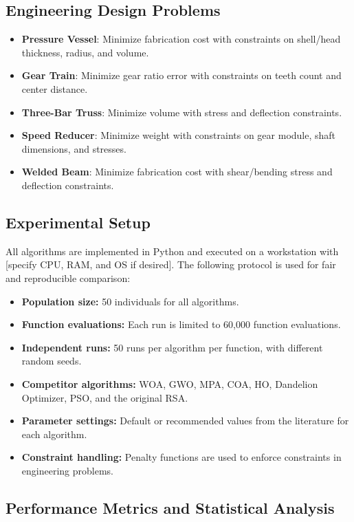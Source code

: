 \documentclass[12pt]{article}
\begin{document}
\subsection{Engineering Design Problems}
\begin{itemize}
    \item \textbf{Pressure Vessel}: Minimize fabrication cost with constraints on shell/head thickness, radius, and volume.
    \item \textbf{Gear Train}: Minimize gear ratio error with constraints on teeth count and center distance.
    \item \textbf{Three-Bar Truss}: Minimize volume with stress and deflection constraints.
    \item \textbf{Speed Reducer}: Minimize weight with constraints on gear module, shaft dimensions, and stresses.
    \item \textbf{Welded Beam}: Minimize fabrication cost with shear/bending stress and deflection constraints.
\end{itemize}


\subsection{Experimental Setup}

All algorithms are implemented in Python and executed on a workstation with [specify CPU, RAM, and OS if desired]. The following protocol is used for fair and reproducible comparison:
\begin{itemize}
    \item \textbf{Population size:} 50 individuals for all algorithms.
    \item \textbf{Function evaluations:} Each run is limited to 60,000 function evaluations.
    \item \textbf{Independent runs:} 50 runs per algorithm per function, with different random seeds.
    \item \textbf{Competitor algorithms:} WOA, GWO, MPA, COA, HO, Dandelion Optimizer, PSO, and the original RSA.
    \item \textbf{Parameter settings:} Default or recommended values from the literature for each algorithm.
    \item \textbf{Constraint handling:} Penalty functions are used to enforce constraints in engineering problems.
\end{itemize}

\subsection{Performance Metrics and Statistical Analysis}
\end{document}
